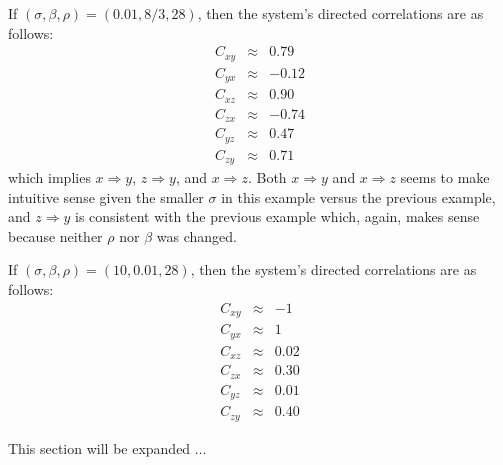 \documentclass[a4paper,11pt]{article}
\begin{document}
If $(\sigma,\beta,\rho)=(0.01,8/3,28)$, then the system's directed correlations are as follows:
\begin{eqnarray*}
C_{xy} &\approx & 0.79\\
C_{yx} &\approx & -0.12\\
C_{xz} &\approx & 0.90\\
C_{zx} &\approx & -0.74\\
C_{yz} &\approx & 0.47\\
C_{zy} &\approx & 0.71
\end{eqnarray*}
which implies $x\Rightarrow y$, $z\Rightarrow y$, and $x\Rightarrow z$.  Both $x\Rightarrow y$ and $x\Rightarrow z$ seems to make intuitive sense given the smaller $\sigma$ in this example versus the previous example, and $z\Rightarrow y$ is consistent with the previous example which, again, makes sense because neither $\rho$ nor $\beta$ was changed.

If $(\sigma,\beta,\rho)=(10,0.01,28)$, then the system's directed correlations are as follows:
\begin{eqnarray*}
C_{xy} &\approx & -1\\
C_{yx} &\approx & 1\\
C_{xz} &\approx & 0.02\\
C_{zx} &\approx & 0.30\\
C_{yz} &\approx & 0.01\\
C_{zy} &\approx & 0.40
\end{eqnarray*}

This section will be expanded $\ldots$
\end{document}
